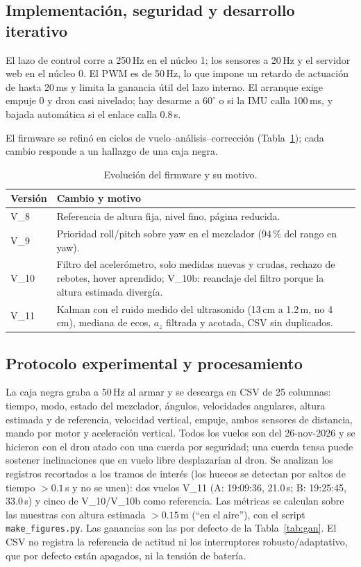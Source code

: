 \subsection{Implementación, seguridad y desarrollo iterativo}
El lazo de control corre a 250\,Hz en el núcleo 1; los sensores a 20\,Hz y el servidor web en el núcleo 0. El PWM es de 50\,Hz, lo que impone un retardo de actuación de hasta 20\,ms y limita la ganancia útil del lazo interno. El arranque exige empuje 0 y dron casi nivelado; hay desarme a $60^\circ$ o si la IMU calla 100\,ms, y bajada automática si el enlace calla 0.8\,s.

El firmware se refinó en ciclos de vuelo--análisis--corrección (Tabla~\ref{tab:vers}); cada cambio responde a un hallazgo de una caja negra.

\begin{table}[t]
\caption{Evolución del firmware y su motivo.}
\label{tab:vers}
\centering\small
\begin{tabular}{@{}lp{6.1cm}@{}}
\toprule
Versión & Cambio y motivo \\
\midrule
V\_8 & Referencia de altura fija, nivel fino, página reducida. \\
V\_9 & Prioridad roll/pitch sobre yaw en el mezclador (94\,\% del rango en yaw). \\
V\_10 & Filtro del acelerómetro, solo medidas nuevas y crudas, rechazo de rebotes, hover aprendido; V\_10b: reanclaje del filtro porque la altura estimada divergía. \\
V\_11 & Kalman con el ruido medido del ultrasonido (13\,cm a 1.2\,m, no 4\,cm), mediana de ecos, $a_z$ filtrada y acotada, CSV sin duplicados. \\
\bottomrule
\end{tabular}
\end{table}

\subsection{Protocolo experimental y procesamiento}
La caja negra graba a 50\,Hz al armar y se descarga en CSV de 25 columnas: tiempo, modo, estado del mezclador, ángulos, velocidades angulares, altura estimada y de referencia, velocidad vertical, empuje, ambos sensores de distancia, mando por motor y aceleración vertical. Todos los vuelos son del 26-nov-2026 y se hicieron con el dron atado con una cuerda por seguridad; una cuerda tensa puede sostener inclinaciones que en vuelo libre desplazarían al dron. Se analizan los registros recortados a los tramos de interés (los huecos se detectan por saltos de tiempo $>0.1$\,s y no se unen): dos vuelos V\_11 (A: 19:09:36, 21.0\,s; B: 19:25:45, 33.0\,s) y cinco de V\_10/V\_10b como referencia. Las métricas se calculan sobre las muestras con altura estimada $>0.15$\,m (``en el aire''), con el script \texttt{make\_figures.py}. Las ganancias son las por defecto de la Tabla~\ref{tab:gan}. El CSV no registra la referencia de actitud ni los interruptores robusto/adaptativo, que por defecto están apagados, ni la tensión de batería.
